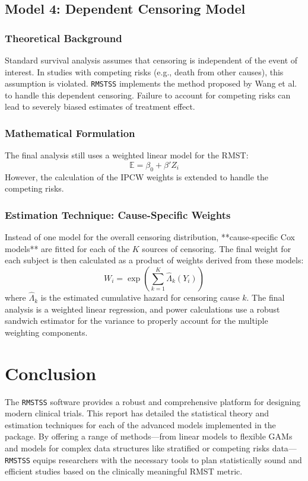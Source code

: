\documentclass[11pt, a4paper]{article}
\begin{document}
\clearpage

\subsection{Model 4: Dependent Censoring Model}
\subsubsection{Theoretical Background}
Standard survival analysis assumes that censoring is independent of the event of interest. In studies with competing risks (e.g., death from other causes), this assumption is violated. \texttt{RMSTSS} implements the method proposed by Wang et al. \cite{wang2018} to handle this dependent censoring. Failure to account for competing risks can lead to severely biased estimates of treatment effect.

\subsubsection{Mathematical Formulation}
The final analysis still uses a weighted linear model for the RMST:
\begin{equation}
\mathbb{E} = \beta_0 + \beta' Z_i
\end{equation}
However, the calculation of the IPCW weights is extended to handle the competing risks.

\subsubsection{Estimation Technique: Cause-Specific Weights}
Instead of one model for the overall censoring distribution, **cause-specific Cox models** are fitted for each of the $K$ sources of censoring. The final weight for each subject is then calculated as a product of weights derived from these models:
\begin{equation}
W_i = \exp\left(\sum_{k=1}^{K} \hat{\Lambda}_{k}(Y_i)\right)
\end{equation}
where $\hat{\Lambda}_{k}$ is the estimated cumulative hazard for censoring cause $k$. The final analysis is a weighted linear regression, and power calculations use a robust sandwich estimator for the variance to properly account for the multiple weighting components.

\section{Conclusion}
The \texttt{RMSTSS} software provides a robust and comprehensive platform for designing modern clinical trials. This report has detailed the statistical theory and estimation techniques for each of the advanced models implemented in the package. By offering a range of methods—from linear models to flexible GAMs and models for complex data structures like stratified or competing risks data—\texttt{RMSTSS} equips researchers with the necessary tools to plan statistically sound and efficient studies based on the clinically meaningful RMST metric.


\end{document}
